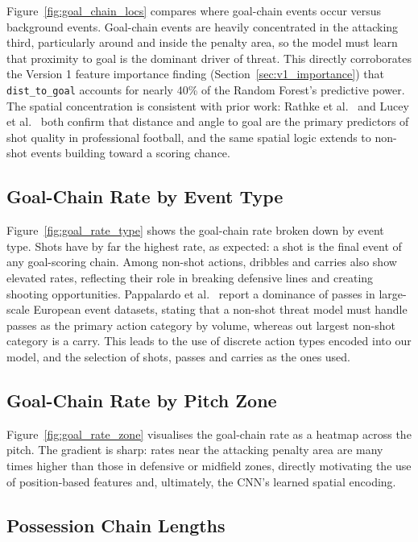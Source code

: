 Figure~\ref{fig:goal_chain_locs} compares where goal-chain events occur versus background events. Goal-chain events are heavily concentrated in the attacking third, particularly around and inside the penalty area, so the model must learn that proximity to goal is the dominant driver of threat. This directly corroborates the Version 1 feature importance finding (Section~\ref{sec:v1_importance}) that \texttt{dist\_to\_goal} accounts for nearly 40\% of the Random Forest's predictive power. The spatial concentration is consistent with prior work: Rathke et al.~\cite{rathke2017} and Lucey et al.~\cite{lucey2015} both confirm that distance and angle to goal are the primary predictors of shot quality in professional football, and the same spatial logic extends to non-shot events building toward a scoring chance.


\subsection{Goal-Chain Rate by Event Type}

Figure~\ref{fig:goal_rate_type} shows the goal-chain rate broken down by event type. Shots have by far the highest rate, as expected: a shot is the final event of any goal-scoring chain. Among non-shot actions, dribbles and carries also show elevated rates, reflecting their role in breaking defensive lines and creating shooting opportunities. Pappalardo et al.~\cite{pappalardo2019} report a  dominance of passes in large-scale European event datasets, stating that a non-shot threat model must handle passes as the primary action category by volume, whereas out largest non-shot category is a carry. This leads to the use of discrete action types encoded into our model, and the selection of shots, passes and carries as the ones used.


\subsection{Goal-Chain Rate by Pitch Zone}

Figure~\ref{fig:goal_rate_zone} visualises the goal-chain rate as a heatmap across the pitch. The gradient is sharp: rates near the attacking penalty area are many times higher than those in defensive or midfield zones, directly motivating the use of position-based features and, ultimately, the CNN's learned spatial encoding.


\subsection{Possession Chain Lengths}

